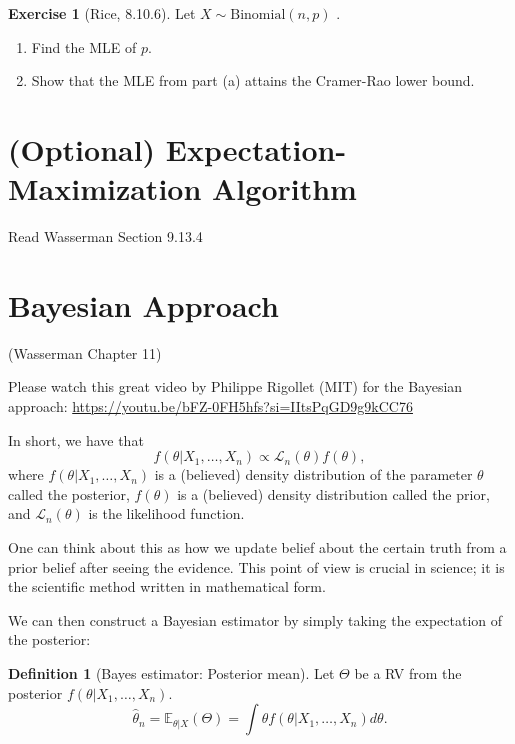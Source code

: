 \documentclass[
  openany]{book}
\theoremstyle{definition}
\newtheorem{definition}{Definition}[chapter]
\theoremstyle{definition}
\theoremstyle{definition}
\newtheorem{exercise}{Exercise}[chapter]
\theoremstyle{definition}
\theoremstyle{remark}
\begin{document}
\begin{exercise}[Rice, 8.10.6]

Let \(X \sim \mathrm{Binomial}(n,p)\) .

\begin{enumerate}
\def\labelenumi{\alph{enumi}.}
\item
  Find the MLE of \(p\).
\item
  Show that the MLE from part (a) attains the Cramer-Rao lower bound.
\end{enumerate}

\end{exercise}

\hypertarget{optional-expectation-maximization-algorithm}{%
\section{(Optional) Expectation-Maximization Algorithm}\label{optional-expectation-maximization-algorithm}}

Read Wasserman Section 9.13.4

\hypertarget{bayesian-approach}{%
\section{Bayesian Approach}\label{bayesian-approach}}

(Wasserman Chapter 11)

Please watch this great video by Philippe Rigollet (MIT) for the Bayesian approach:
\url{https://youtu.be/bFZ-0FH5hfs?si=IItsPqGD9g9kCC76}

In short, we have that
\[ f(\theta | X_1, \dots, X_n) \propto \mathcal{L}_n (\theta) f(\theta), \]
where \(f(\theta | X_1, \dots, X_n)\) is a (believed) density distribution of the parameter \(\theta\) called the posterior,
\(f(\theta)\) is a (believed) density distribution called the prior,
and \(\mathcal{L}_n(\theta)\) is the likelihood function.

One can think about this as how we update belief about the certain truth
from a prior belief after seeing the evidence.
This point of view is crucial in science; it is the scientific method written in mathematical form.

We can then construct a Bayesian estimator by simply taking the expectation of the posterior:

\begin{definition}[Bayes estimator: Posterior mean]
Let \(\Theta\) be a RV from the posterior \(f(\theta | X_1, \dots, X_n)\).
\[ \hat \theta_n = \mathbb{E}_{\theta|X}(\Theta) = \int \theta f(\theta | X_1, \dots, X_n) d\theta.\]
\end{definition}
\end{document}
